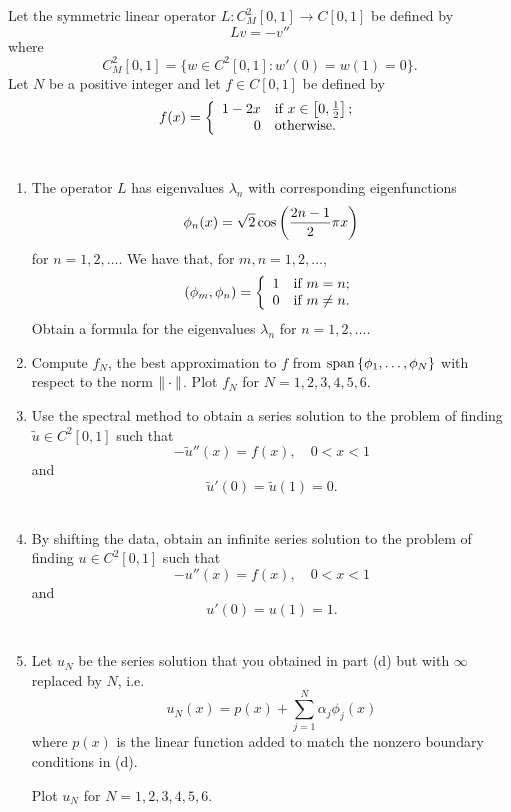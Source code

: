 
%
Let the symmetric linear operator $L: C^2_M[0,1]\to C[0,1]$ be defined by
\[
L v = -v''
\]
where
\[
C^2_M[0,1] = \{ w \in C^2[0,1] : w'(0) = w(1) = 0\}.
\]
Let $N$ be a positive integer and let $f\in C[0,1]$ be defined by
\[
f(x)=\left\{\begin{array}{rl}1-2x&\mbox{if }x\in\left[0,{1\over2}\right];\\0&\mbox{otherwise}.\end{array}\right.
\]
\\
\begin{enumerate}
\item The operator $L$ has eigenvalues $\lambda_n$ with corresponding eigenfunctions
\[
\phi_n(x) = \sqrt{2} \cos\left({2n-1\over 2}\pi x\right)
\]
for $n=1,2,\ldots$. We have that, for $m,n=1,2,\ldots$,
\[
(\phi_m,\phi_n)=\left\{\begin{array}{rl}1&\mbox{if }m=n;\\0&\mbox{if }m\ne n.\end{array}\right.
\]
Obtain a formula for the eigenvalues $\lambda_n$ for $n=1,2,\ldots$.
\\
\item Compute $f_N$, the best approximation to $f$ from ${\rm span}\left\{\phi_1,\ldots,\phi_N\right\}$ with respect to the norm $\|\cdot\|$.  Plot $f_N$ for $N = 1,2,3,4,5,6$.
\\
\item Use the spectral method to obtain a series solution to the problem of finding $\tilde{u}\in C^2[0,1]$ such that
\[
-\tilde{u}''(x) = f(x),\quad 0<x<1
\]
and
\[
\tilde{u}'(0) = \tilde{u}(1) = 0.
\]
\\
\item By shifting the data, obtain an infinite series solution to the problem of finding $u\in C^2[0,1]$ such that
\[
-u''(x) = f(x),\quad 0<x<1
\]
and
\[
u'(0) = u(1) = 1.
\]
\\
\item Let ${u}_N$ be the series solution that you obtained in part (d) but with $\infty$ replaced by $N$, i.e.
\[
{u}_N(x) = p(x) + \sum_{j = 1}^N \alpha_j \phi_j(x)
\]
where $p(x)$ is the linear function added to match the nonzero boundary conditions in (d).  

Plot ${u}_N$ for $N=1,2,3,4,5,6$.

\end{enumerate}




